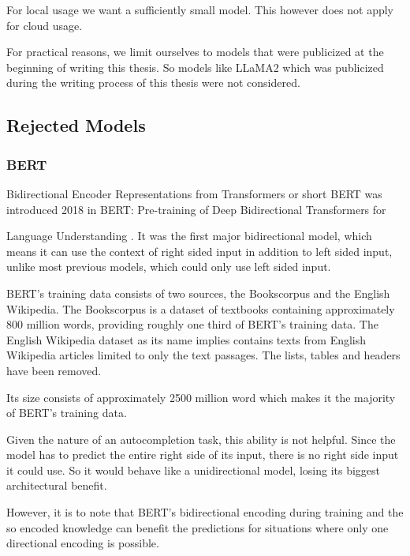 For local usage we want a sufficiently small model. This however does not apply for cloud usage. 

For practical reasons, we limit ourselves to models that were publicized at the beginning of writing this thesis. So models like LLaMA2\cite{touvron2023llama2} which was publicized during the writing process of this thesis were not considered.



\subsection{Rejected Models}


\subsubsection{BERT}

Bidirectional Encoder Representations from Transformers or short BERT was introduced  2018  in BERT: Pre-training of Deep Bidirectional Transformers for

Language Understanding \cite{devlin2019bert}. It was the first major bidirectional model, which means it can use the context of right sided input in addition to left sided input, unlike most previous models, which could only use left sided input.


 

 BERT's training data consists of two sources, the Bookscorpus and the English Wikipedia. The Bookscorpus is a dataset of textbooks containing approximately 800 million words, providing roughly one third of BERT's training data. The English Wikipedia dataset as its name implies contains texts from English Wikipedia articles limited to only the text passages. The lists, tables and headers have been removed.

Its size consists of approximately 2500 million word which makes it the majority of BERT's training data. \cite{devlin2019bert}



 Given the nature of an autocompletion task, this ability is not helpful. Since the model has to predict the entire right side of its input, there is no right side input it could use. So it would behave like a unidirectional model, losing its biggest architectural benefit.

 

However, it is to note that BERT's bidirectional encoding during training and the so encoded knowledge can benefit the predictions  for situations where only one directional encoding is possible.


